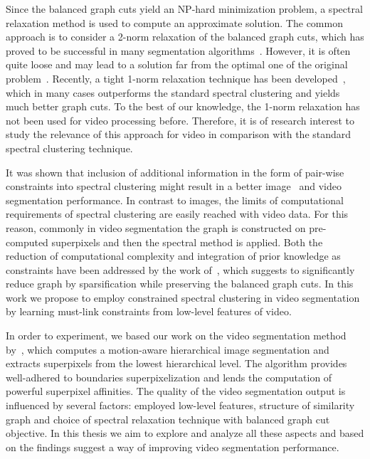 Since the balanced graph cuts yield an NP-hard minimization problem, a spectral relaxation method is used to compute an approximate solution.
The common approach is to consider a 2-norm relaxation of the balanced graph cuts, which has proved to be successful in many segmentation algorithms~\cite{Brox10,Arbelaez11,GalassoCS12,Galasso14}. 
However, it is often quite loose and may lead to a solution far from the optimal one of the original problem~\cite{guattery1998}.
Recently, a tight 1-norm relaxation technique has been developed~\cite{Buhler09}, which in many cases outperforms the standard spectral clustering and yields much better graph cuts. 
To the best of our knowledge, the 1-norm relaxation has not been used for video processing before. Therefore, it is of research interest to study the relevance of this approach for video in comparison
with the standard spectral clustering technique. 

It was shown that inclusion of additional information in the form of pair-wise constraints into spectral clustering might result in a better image~\cite{MajiVM11} and video~\cite{Galasso14} segmentation performance.
In contrast to images, the limits of computational requirements of spectral clustering are easily reached with video data. For this reason, commonly in video segmentation 
the graph is constructed on pre-computed superpixels and then the spectral method is applied. 
Both the reduction of computational complexity and integration of prior knowledge as constraints have been addressed by the work of~\cite{RangapuramH12}, 
which suggests to significantly reduce graph by sparsification while preserving the balanced graph cuts. 
In this work we propose to employ constrained spectral clustering in video segmentation by learning must-link constraints from low-level features of video.

In order to experiment, we based our work on the video segmentation method by~\cite{GalassoCS12}, which computes a motion-aware hierarchical image segmentation and extracts superpixels 
from the lowest hierarchical level. The algorithm provides well-adhered to boundaries superpixelization and lends the computation of powerful superpixel affinities.
The quality of the video segmentation output is influenced by several factors: employed low-level features, structure of similarity graph and choice of spectral relaxation technique with
balanced graph cut objective. In this thesis we aim to explore and analyze all these aspects and based on the findings suggest a way of improving video segmentation performance.

